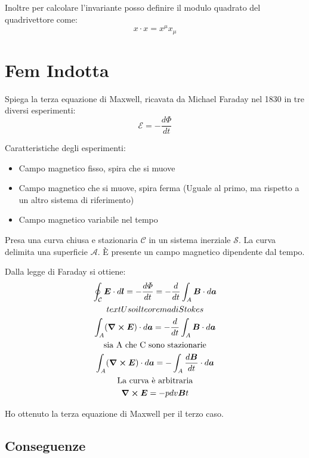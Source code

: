 \documentclass[a4paper]{scrarticle}
\begin{document}
Inoltre per calcolare l'invariante posso definire il modulo quadrato del quadrivettore come:
\begin{equation}
    x \cdot x = x^\mu x_\mu
\end{equation}

\section{Fem Indotta}

Spiega la terza equazione di Maxwell, ricavata da Michael Faraday nel 1830 in tre diversi esperimenti: 
\begin{equation}
    \mathcal{E} = -\frac{d \varPhi}{dt}
\end{equation}

Caratteristiche degli esperimenti:
\begin{itemize}
    \item Campo magnetico fisso, spira che si muove
    \item Campo magnetico che si muove, spira ferma (Uguale al primo, ma rispetto a un altro sistema di riferimento)
    \item Campo magnetico variabile nel tempo
\end{itemize}

Presa una curva chiusa e stazionaria $\mathcal{C}$ in un sistema inerziale $\mathcal{S}$. La curva delimita una superficie $\mathcal{A}$. È presente un campo magnetico dipendente dal tempo.

Dalla legge di Faraday si ottiene:
\begin{gather*}
    \oint_\mathcal{C} \bm E \cdot d\bm l = - \frac{d \varPhi}{dt} = - \frac{d}{dt} \int_A \bm B \cdot d\bm a\\
    text{Uso il teorema di Stokes}\\
    \int_A (\curl \bm E)\cdot d\bm a = - \frac{d}{dt} \int_A \bm B \cdot d\bm a\\
    \text{sia A che C sono stazionarie}\\
    \int_A (\curl \bm E)\cdot d\bm a = -  \int_A \frac{d\bm B}{dt} \cdot d\bm a\\
    \text{La curva è arbitraria}\\
    \curl \bm E = - pdv{\bm B}{t}
\end{gather*}

Ho ottenuto la terza equazione di Maxwell per il terzo caso.

\subsection{Conseguenze}
\end{document}
